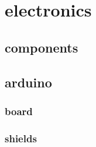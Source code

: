 \chapter{electronics}
\section{components}
\section{arduino}
\subsection{board}
\subsection{shields}

